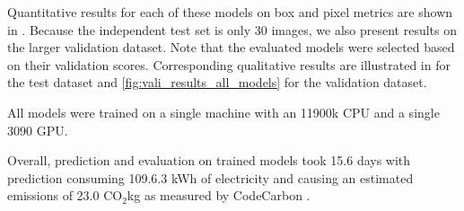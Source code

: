 \documentclass[10pt,twocolumn,letterpaper]{article}
\newcommand{\cotwo}{\ensuremath{\mathrm{CO_2}}}
\begin{document}
Quantitative results for each of these models on box and pixel metrics are shown in
  .
Because the independent test set is only 30 images, we also present results on the larger validation
  dataset.
Note that the evaluated models were selected based on their validation scores.
Corresponding qualitative results are illustrated in  for the test dataset
  and \cref{fig:vali_results_all_models} for the validation dataset.


All models were trained on a single machine with an 11900k CPU and a single 3090 GPU.

Overall, prediction and evaluation on trained models took 15.6 days with prediction consuming 109.6.3 kWh of
  electricity and causing an estimated emissions of 23.0 \cotwo kg as measured by CodeCarbon
  \cite{lacoste2019codecarbon}.
\end{document}

